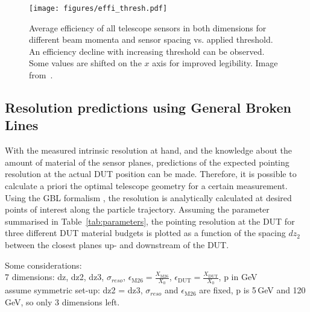 \begin{figure}[tbp]
  \centering
  \texttt{[image: figures/effi\_thresh.pdf]}
  \caption[Overall telescope sensor efficiency vs. threshold for different beam momenta and sensor spacings~\cite{ref:thomas}]{
 Average efficiency of all telescope sensors in both dimensions for different beam momenta and sensor spacing vs. applied threshold.
An efficiency decline with increasing threshold can be observed.
Some values are shifted on the $x$ axis for improved legibility.
Image from~\cite{ref:thomas}.}
\label{fig:effi_thresh}
\end{figure}



\subsection{Resolution predictions using General Broken Lines}

With the measured intrinsic resolution at hand, and the knowledge about the amount of material of the sensor planes, predictions of the expected pointing resolution at the actual DUT position can be made. 
Therefore, it is possible to calculate a priori the optimal telescope geometry for a certain measurement. 
Using the GBL formalism \cite{Kleinwort-2012,Blobel-2006}, the resolution is analytically calculated at desired points of interest along the particle trajectory. 
Assuming the parameter summarised in Table~\ref{tab:parameters}, the pointing resolution at the DUT for three different DUT material budgets is plotted as a function of the spacing $dz_2$ between
 the closest planes up- and downstream of the DUT.
 
Some considerations:\\
7 dimensions: dz, dz2, dz3, $\sigma_{reso}$, $\epsilon_{\textrm{M26}} = \frac{X_{\textrm{M26}}}{X_0}$, $\epsilon_{\textrm{DUT}} = \frac{X_{\textrm{DUT}}}{X_0}$,  p in GeV\\
assume symmetric set-up: dz2 = dz3, $\sigma_{reso}$ and $\epsilon_{\textrm{M26}}$ are fixed, p is 5\,GeV and 120\,GeV, so only 3 dimensions left.



